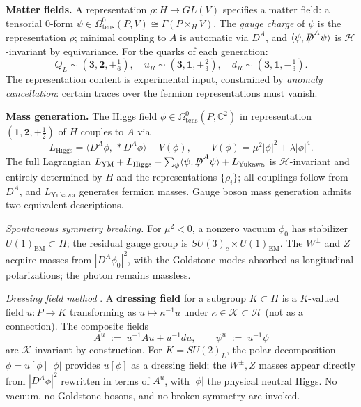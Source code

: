 {\medskip
\textbf{Matter fields.}\quad
A representation $\rho\colon H\to GL(V)$ specifies a matter field: a tensorial 0-form
$\psi\in\Omega^0_{\mathrm{tens}}(P,V)\cong\Gamma(P\times_H V)$.
The \emph{gauge charge} of $\psi$ is the representation $\rho$; minimal coupling to
$A$ is automatic via $D^A$, and $\langle\psi,\slashed{D}^A\psi\rangle$ is
$\mathcal{H}$-invariant by equivariance.
For the quarks of each generation:
\[
    Q_L\sim(\mathbf{3},\mathbf{2},+\tfrac{1}{6}),\quad
    u_R\sim(\mathbf{3},\mathbf{1},+\tfrac{2}{3}),\quad
    d_R\sim(\mathbf{3},\mathbf{1},-\tfrac{1}{3}).
\]
The representation content is experimental input, constrained by
\emph{anomaly cancellation}: certain traces over the fermion representations must vanish.

\medskip
\textbf{Mass generation.}\quad
The Higgs field $\phi\in\Omega^0_{\mathrm{tens}}(P,\mathbb{C}^2)$ in representation
$(\mathbf{1},\mathbf{2},+\tfrac{1}{2})$ of $H$ couples to $A$ via
\[
    L_{\mathrm{Higgs}}=\langle D^A\phi,\,{*}D^A\phi\rangle-V(\phi),
    \qquad
    V(\phi)=\mu^2|\phi|^2+\lambda|\phi|^4.
\]
The full Lagrangian $L_{\mathrm{YM}}+L_{\mathrm{Higgs}}
+\sum_\psi\langle\psi,\slashed{D}^A\psi\rangle+L_{\mathrm{Yukawa}}$
is $\mathcal{H}$-invariant and entirely determined by $H$ and the representations
$\{\rho_i\}$; all couplings follow from $D^A$, and $L_{\mathrm{Yukawa}}$ generates
fermion masses.
Gauge boson mass generation admits two equivalent descriptions.

\smallskip
\textit{Spontaneous symmetry breaking.}\enspace
For $\mu^2<0$, a nonzero vacuum $\phi_0$ has stabilizer $U(1)_{\mathrm{EM}}\subset H$;
the residual gauge group is $SU(3)_c\times U(1)_{\mathrm{EM}}$.
The $W^\pm$ and $Z$ acquire masses from $|D^A\phi_0|^2$, with the Goldstone modes
absorbed as longitudinal polarizations; the photon remains massless.

\smallskip
\textit{Dressing field method} \citep{Attarddressingfieldmethodgaugesymmetryreductionreviewexamples2017}.\enspace
A \textbf{dressing field} for a subgroup $K\subset H$ is a $K$-valued field
$u\colon P\to K$ transforming as $u\mapsto\kappa^{-1}u$ under
$\kappa\in\mathcal{K}\subset\mathcal{H}$ (not as a connection).
The composite fields
\[
    A^u \;:=\; u^{-1}Au+u^{-1}du,\qquad \psi^u \;:=\; u^{-1}\psi
\]
are $\mathcal{K}$-invariant by construction.
For $K=SU(2)_L$, the polar decomposition $\phi=u[\phi]\,|\phi|$ provides $u[\phi]$
as a dressing field; the $W^\pm,Z$ masses appear directly from $|D^A\phi|^2$
rewritten in terms of $A^u$, with $|\phi|$ the physical neutral Higgs.
No vacuum, no Goldstone bosons, and no broken symmetry are invoked.

}
